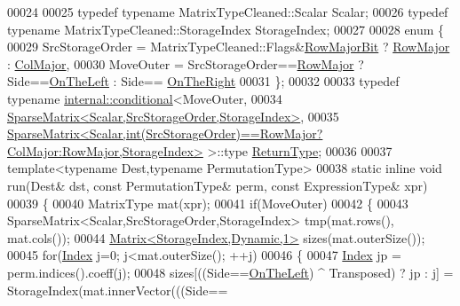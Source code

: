 \begin{DoxyCode}
00024 
00025     \textcolor{keyword}{typedef} \textcolor{keyword}{typename} MatrixTypeCleaned::Scalar Scalar;
00026     \textcolor{keyword}{typedef} \textcolor{keyword}{typename} MatrixTypeCleaned::StorageIndex StorageIndex;
00027 
00028     \textcolor{keyword}{enum} \{
00029       SrcStorageOrder = MatrixTypeCleaned::Flags&\hyperlink{group__flags_gae4f56c2a60bbe4bd2e44c5b19cbe8762}{RowMajorBit} ? 
      \hyperlink{group__enums_ggaacded1a18ae58b0f554751f6cdf9eb13acfcde9cd8677c5f7caf6bd603666aae3}{RowMajor} : \hyperlink{group__enums_ggaacded1a18ae58b0f554751f6cdf9eb13a0cbd4bdd0abcfc0224c5fcb5e4f6669a}{ColMajor},
00030       MoveOuter = SrcStorageOrder==\hyperlink{group__enums_ggaacded1a18ae58b0f554751f6cdf9eb13acfcde9cd8677c5f7caf6bd603666aae3}{RowMajor} ? Side==\hyperlink{group__enums_ggac22de43beeac7a78b384f99bed5cee0ba129609b3bdf23b071f5f86cf2f995ec4}{OnTheLeft} : Side==
      \hyperlink{group__enums_ggac22de43beeac7a78b384f99bed5cee0ba99dc75d8e00b6c3a5bdc31940f47492b}{OnTheRight}
00031     \};
00032     
00033     \textcolor{keyword}{typedef} \textcolor{keyword}{typename} \hyperlink{struct_eigen_1_1internal_1_1conditional}{internal::conditional}<MoveOuter,
00034         \hyperlink{group___sparse_core___module_class_eigen_1_1_sparse_matrix}{SparseMatrix<Scalar,SrcStorageOrder,StorageIndex>},
00035         
      \hyperlink{group___sparse_core___module_class_eigen_1_1_sparse_matrix}{SparseMatrix<Scalar,int(SrcStorageOrder)==RowMajor?ColMajor:RowMajor,StorageIndex>}
       >::type \hyperlink{class_eigen_1_1internal_1_1_tensor_lazy_evaluator_writable}{ReturnType};
00036 
00037     \textcolor{keyword}{template}<\textcolor{keyword}{typename} Dest,\textcolor{keyword}{typename} PermutationType>
00038     \textcolor{keyword}{static} \textcolor{keyword}{inline} \textcolor{keywordtype}{void} run(Dest& dst, \textcolor{keyword}{const} PermutationType& perm, \textcolor{keyword}{const} ExpressionType& xpr)
00039     \{
00040       MatrixType mat(xpr);
00041       \textcolor{keywordflow}{if}(MoveOuter)
00042       \{
00043         SparseMatrix<Scalar,SrcStorageOrder,StorageIndex> tmp(mat.rows(), mat.cols());
00044         \hyperlink{group___core___module}{Matrix<StorageIndex,Dynamic,1>} sizes(mat.outerSize());
00045         \textcolor{keywordflow}{for}(\hyperlink{namespace_eigen_a62e77e0933482dafde8fe197d9a2cfde}{Index} j=0; j<mat.outerSize(); ++j)
00046         \{
00047           \hyperlink{namespace_eigen_a62e77e0933482dafde8fe197d9a2cfde}{Index} jp = perm.indices().coeff(j);
00048           sizes[((Side==\hyperlink{group__enums_ggac22de43beeac7a78b384f99bed5cee0ba129609b3bdf23b071f5f86cf2f995ec4}{OnTheLeft}) ^ Transposed) ? jp : j] = StorageIndex(mat.innerVector(((Side==

\end{DoxyCode}
